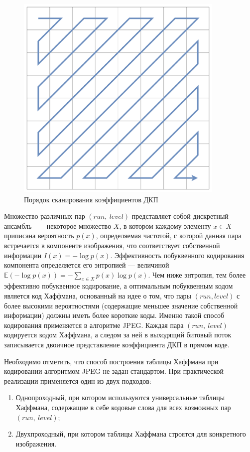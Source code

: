 \documentclass[times,specification,annotation]{itmo-student-thesis}
\begin{document}
\begin{figure}[!h]
    \centering
    \includegraphics[width=10cm]{./images/zigzag-order.png}
    \caption{Порядок сканирования коэффициентов ДКП}
    \label{image:zigzag-order}
\end{figure}

Множество различных пар $(run,\ level)$ представляет собой дискретный ансамбль~\cite{information-theory} --- некоторое множество $X$, в котором каждому элементу $x\in X$ приписана вероятность $p(x)$, определяемая частотой, с которой данная пара встречается в компоненте изображения, что соответствует собственной информации $I(x)=-\log p(x)$. Эффективность побуквенного кодирования компонента определяется его энтропией --- величиной $\mathbb{E}(-\log p(x))=-\sum_{x\in X}p(x)\log p(x)$. Чем ниже энтропия, тем более эффективно побуквенное кодирование, а оптимальным побуквенным кодом является код Хаффмана, основанный на идее о том, что пары $(run, level)$ с более высокими вероятностями (содержащие меньшее значение собственной информации) должны иметь более короткие коды. Именно такой способ кодирования применяется в алгоритме JPEG. Каждая пара $(run,\ level)$ кодируется кодом Хаффмана, а следом за ней в выходящий битовый поток записывается двоичное представление коэффициента ДКП в прямом коде.\par

Необходимо отметить, что способ построения таблицы Хаффмана при кодировании алгоритмом JPEG не задан стандартом. При практической реализации применяется один из двух подходов:
\begin{enumerate}
    \item Однопроходный, при котором используются универсальные таблицы Хаффмана, содержащие в себе кодовые слова для всех возможных пар $(run,\ level)$;
    \item Двухпроходный, при котором таблицы Хаффмана строятся для конкретного изображения.
\end{enumerate}
\end{document}
